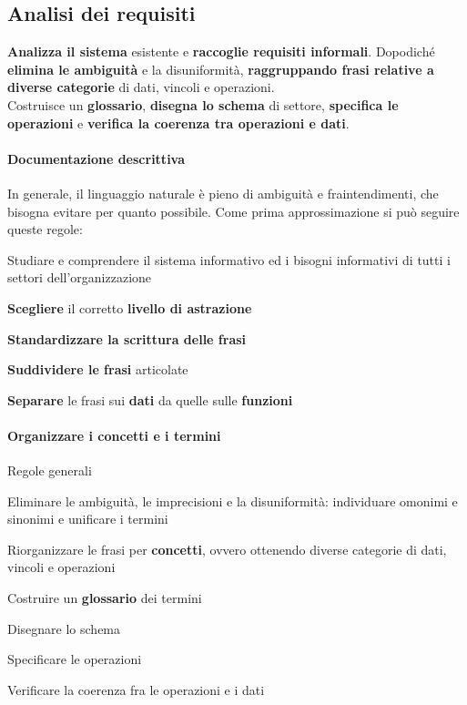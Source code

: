 \documentclass[10pt]{book}
\begin{document}
\subsection{Analisi dei requisiti}
\textbf{Analizza il sistema} esistente e \textbf{raccoglie requisiti informali}. Dopodiché \textbf{elimina le ambiguità} e la disuniformità, \textbf{raggruppando frasi relative a diverse categorie} di dati, vincoli e operazioni.\\
Costruisce un \textbf{glossario}, \textbf{disegna lo schema} di settore, \textbf{specifica le operazioni} e \textbf{verifica la coerenza tra operazioni e dati}.
\paragraph{Documentazione descrittiva} In generale, il linguaggio naturale è pieno di ambiguità e fraintendimenti, che bisogna evitare per quanto possibile. Come prima approssimazione si può seguire queste regole:
\begin{list}{}{}
	\item Studiare e comprendere il sistema informativo ed i bisogni informativi di tutti i settori dell'organizzazione
	\item \textbf{Scegliere} il corretto \textbf{livello di astrazione}
	\item \textbf{Standardizzare la scrittura delle frasi}
	\item \textbf{Suddividere le frasi} articolate
	\item \textbf{Separare} le frasi sui \textbf{dati} da quelle sulle \textbf{funzioni}
\end{list}
\paragraph{Organizzare i concetti e i termini} Regole generali
\begin{list}{}{}
	\item Eliminare le ambiguità, le imprecisioni e la disuniformità: individuare omonimi e sinonimi e unificare i termini
	\item Riorganizzare le frasi per \textbf{concetti}, ovvero ottenendo diverse categorie di dati, vincoli e operazioni
	\item Costruire un \textbf{glossario} dei termini
	\item Disegnare lo schema
	\item Specificare le operazioni
	\item Verificare la coerenza fra le operazioni e i dati
\end{list}
\end{document}
